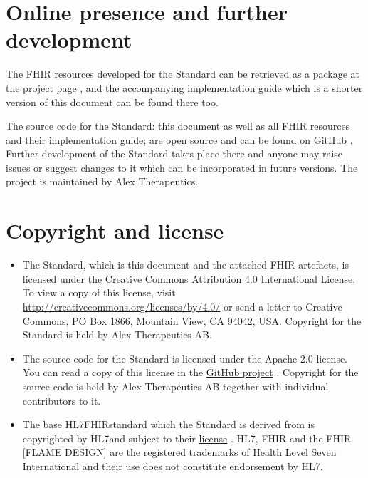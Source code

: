 \documentclass[12px]{report}
\newcommand{\fhir}{FHIR\textsuperscript{\textregistered}}
\newcommand{\hl}{HL7\textsuperscript{\textregistered}}
\begin{document}
\section{Online presence and further development}
The FHIR resources developed for the Standard can be retrieved as a package at the \href{https://simplifier.net/treat-nicotine-usage-diga}{project page} \cite{project}, 
and the accompanying implementation guide which is a shorter version of this document can be found there too.

The source code for the Standard: this document as well as all FHIR resources and their implementation guide; are open source and can be 
found on \href{https://github.com/alex-therapeutics/diga-nicotine-usage-fhir}{GitHub} \cite{github}. Further development of the Standard
takes place there and anyone may raise issues or suggest changes to it which can be incorporated in future versions.
The project is maintained by Alex Therapeutics.

\section{Copyright and license}

\begin{itemize}
    \item The Standard, which is this document and the attached FHIR artefacts, is licensed under the Creative Commons Attribution 4.0 International License. 
To view a copy of this license, visit \href{http://creativecommons.org/licenses/by/4.0/}{http://creativecommons.org/licenses/by/4.0/} or send a letter to Creative Commons, PO Box 1866, Mountain View, CA 94042, USA.
Copyright for the Standard is held by Alex Therapeutics AB. 
    \item The source code for the Standard is licensed under the Apache 2.0 license. 
You can read a copy of this license in the \href{https://github.com/alex-therapeutics/diga-nicotine-usage-fhir/blob/main/LICENSE}{GitHub project} \cite{github}.
Copyright for the source code is held by Alex Therapeutics AB together with individual contributors to it.
    \item The base \hl \fhir standard which the Standard is derived from is copyrighted by \hl and subject to their \href{http://hl7.org/fhir/license.html}{license} \cite{fhirlic}.
HL7, FHIR and the FHIR [FLAME DESIGN] are the registered trademarks of Health Level Seven International and their use does not constitute endorsement by HL7.
\end{itemize}
\end{document}
